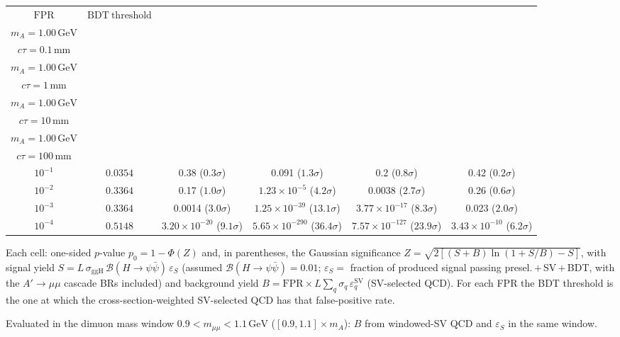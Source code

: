 \documentclass[10pt,a4paper]{article}
\begin{document}
{\begin{tabular}{cccccc}
\toprule
$\mathrm{FPR}$ & $\mathrm{BDT\ threshold}$ & \shortstack{$m_{\pi}=10\,\mathrm{GeV}$\\$m_{A}=1.00\,\mathrm{GeV}$\\$c\tau=0.1\,\mathrm{mm}$} & \shortstack{$m_{\pi}=10\,\mathrm{GeV}$\\$m_{A}=1.00\,\mathrm{GeV}$\\$c\tau=1\,\mathrm{mm}$} & \shortstack{$m_{\pi}=10\,\mathrm{GeV}$\\$m_{A}=1.00\,\mathrm{GeV}$\\$c\tau=10\,\mathrm{mm}$} & \shortstack{$m_{\pi}=10\,\mathrm{GeV}$\\$m_{A}=1.00\,\mathrm{GeV}$\\$c\tau=100\,\mathrm{mm}$} \\
\midrule
$10^{-1}$ & $0.0354$ & 0.38 ($0.3\sigma$) & 0.091 ($1.3\sigma$) & 0.2 ($0.8\sigma$) & 0.42 ($0.2\sigma$)\\
$10^{-2}$ & $0.3364$ & 0.17 ($1.0\sigma$) & $1.23\times10^{-5}$ ($4.2\sigma$) & 0.0038 ($2.7\sigma$) & 0.26 ($0.6\sigma$)\\
$10^{-3}$ & $0.3364$ & 0.0014 ($3.0\sigma$) & $1.25\times10^{-39}$ ($13.1\sigma$) & $3.77\times10^{-17}$ ($8.3\sigma$) & 0.023 ($2.0\sigma$)\\
$10^{-4}$ & $0.5148$ & $3.20\times10^{-20}$ ($9.1\sigma$) & $5.65\times10^{-290}$ ($36.4\sigma$) & $7.57\times10^{-127}$ ($23.9\sigma$) & $3.43\times10^{-10}$ ($6.2\sigma$)\\
\bottomrule
\end{tabular}

{\small Each cell: one-sided $p$-value $p_0=1-\Phi(Z)$ and, in parentheses, the Gaussian significance $Z=\sqrt{2\left[(S{+}B)\ln(1{+}S/B)-S\right]}$, with signal yield $S=L\,\sigma_{\mathrm{ggH}}\,\mathcal{B}(H\to\psi\bar{\psi})\,\varepsilon_S$ (assumed $\mathcal{B}(H\to\psi\bar{\psi})=0.01$; $\varepsilon_S=$ fraction of produced signal passing presel.\,$+$\,SV\,$+$\,BDT, with the $A'\to\mu\mu$ cascade BRs included) and background yield $B=\mathrm{FPR}\times L\sum_q\sigma_q\,\varepsilon_q^{\mathrm{SV}}$ (SV-selected QCD). For each FPR the BDT threshold is the one at which the cross-section-weighted SV-selected QCD has that false-positive rate.}

{\small Evaluated in the dimuon mass window $0.9<m_{\mu\mu}<1.1\,\mathrm{GeV}$ ($[0.9,1.1]\times m_A$): $B$ from windowed-SV QCD and $\varepsilon_S$ in the same window.}

}\clearpage
\end{document}
